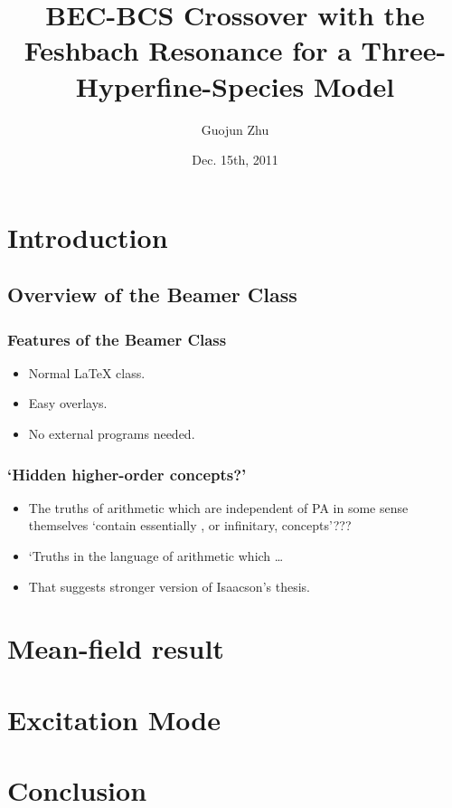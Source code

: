 \documentclass{beamer}
\title[Crossover w/ 3-species]{BEC-BCS Crossover with the Feshbach Resonance for a Three-Hyperfine-Species Model}
\author[Guojun Zhu]{Guojun Zhu}
\institute{University of Illinois at Urbana-Champaign}
\date{Dec. 15th, 2011}
\begin{document}
\frame{\titlepage}

\section[Outline]{}
\frame{\tableofcontents}

\section{Introduction}
\subsection{Overview of the Beamer Class}
\frame
{
  \frametitle{Features of the Beamer Class}

  \begin{itemize}
  \item<1-> Normal LaTeX class.
  \item<2-> Easy overlays.
  \item<3-> No external programs needed.      
  \end{itemize}
}

\begin{frame}
        \frametitle{`Hidden higher-order concepts?'}
        \begin{itemize}[<+->]
        \item The truths of arithmetic which are independent of PA in some 
        sense themselves `{contain} essentially {\color{blue}{hidden higher-order}},
         or infinitary, concepts'???
        \item `Truths in the language of arithmetic which \ldots
        \item That suggests stronger version of Isaacson's thesis. 
        \end{itemize}
\end{frame}
\section{Mean-field result}
\frame{}
\section{Excitation Mode}
\frame{}
\section{Conclusion}
\frame{}
\end{document}
